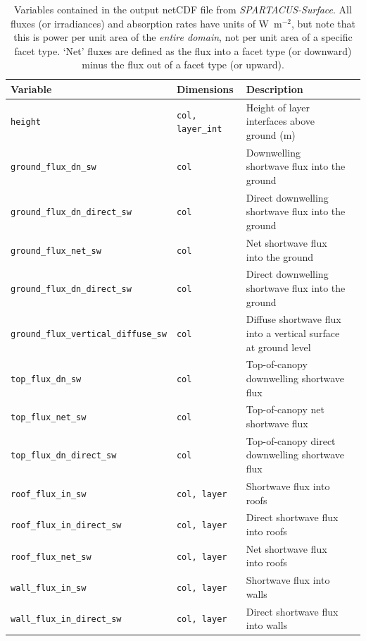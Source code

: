\documentclass[a4,oneside]{article}
\def\tablesetup{\rowcolors{2}{light-gray}{light-gray}\small}
\def\codetabsize{\footnotesize}
\def\spsurf{\emph{SPARTACUS-Surface}}
\def\codetab#1{{\codetabsize\texttt{#1}}}
\begin{document}
{
\tablesetup
\begin{longtable}{llLp{7cm}}%
\caption{\label{tab:outvar}Variables contained in the output netCDF
  file from \spsurf.  All fluxes (or irradiances) and absorption rates
  have units of W~m$^{-2}$, but note that this is power per unit area
  of the \emph{entire domain}, not per unit area of a specific facet
  type.  `Net' fluxes are defined as the flux into a facet type (or downward) minus the
  flux out of a facet type (or upward).}\\
%
\hline
Variable & Dimensions & Description\\
\hline
\codetab{height} & \codetab{col, layer\_int} & Height of layer interfaces above ground (m)\\
\codetab{ground\_flux\_dn\_sw} & \codetab{col} & Downwelling shortwave flux into the ground \\
\codetab{ground\_flux\_dn\_direct\_sw} & \codetab{col} & Direct downwelling shortwave flux into the ground \\
\codetab{ground\_flux\_net\_sw} & \codetab{col} & Net shortwave flux into the ground\\
\codetab{ground\_flux\_dn\_direct\_sw} & \codetab{col} & Direct downwelling shortwave flux into the ground\\
\codetab{ground\_flux\_vertical\_diffuse\_sw} & \codetab{col} & Diffuse shortwave flux into a vertical surface at ground level\\
\codetab{top\_flux\_dn\_sw} & \codetab{col} & Top-of-canopy downwelling shortwave flux\\
\codetab{top\_flux\_net\_sw} & \codetab{col} & Top-of-canopy net shortwave flux\\
\codetab{top\_flux\_dn\_direct\_sw} & \codetab{col} & Top-of-canopy direct downwelling shortwave flux\\
\codetab{roof\_flux\_in\_sw} & \codetab{col, layer} & Shortwave flux into roofs \\
\codetab{roof\_flux\_in\_direct\_sw} & \codetab{col, layer} & Direct shortwave flux into roofs \\
\codetab{roof\_flux\_net\_sw} & \codetab{col, layer} & Net shortwave flux into roofs\\
\codetab{wall\_flux\_in\_sw} & \codetab{col, layer} & Shortwave flux into walls\\
\codetab{wall\_flux\_in\_direct\_sw} & \codetab{col, layer} & Direct shortwave flux into walls\\

\end{longtable}}
\end{document}
